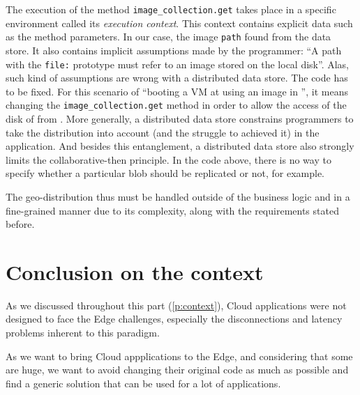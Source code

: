 The execution of the method \verb|image_collection.get| takes place in
a specific environment called its \emph{execution context}.
%
This context contains explicit data such as the method parameters.
%
In our case, the image \verb|path| found from the data store.
%
It also contains implicit assumptions made by the programmer: ``A path
with the \verb|file:| prototype must refer to an image stored on the
local disk''.
%
Alas, such kind of assumptions are wrong with a distributed data
store.
%
The code has to be fixed.
%
For this scenario of ``booting a VM at \sOne using an image in
\sTwo'', it means changing the \verb|image_collection.get| method in
order to allow the access of the disk of \sTwo from \sOne.
%
More generally, a distributed data store constrains programmers to
take the distribution into account (and the struggle to achieved it)
in the application.
%
And besides this entanglement, a distributed data store also strongly
limits the collaborative-then principle.
%
In the code above, there is no way to specify whether a particular
blob should be replicated or not, for example.
%

The geo-distribution thus must be handled outside of the business
logic and in a fine-grained manner due to its complexity, along with
the requirements stated before.


\section{Conclusion on the context} %
\label{sec:cccontext}

As we discussed throughout this part (\autoref{p:context}), Cloud
applications were not designed to face the Edge challenges, especially
the disconnections and latency problems inherent to this paradigm.

As we want to bring Cloud appplications to the Edge, and considering
that some are huge, we want to avoid changing their original code as
much as possible and find a generic solution that can be used for a
lot of applications.


